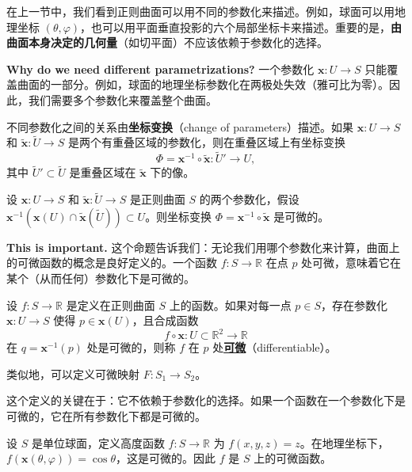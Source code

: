 在上一节中，我们看到正则曲面可以用不同的参数化来描述。例如，球面可以用地理坐标 $(\theta, \varphi)$，也可以用平面垂直投影的六个局部坐标卡来描述。重要的是，\textbf{由曲面本身决定的几何量}（如切平面）不应该依赖于参数化的选择。

\textbf{Why do we need different parametrizations?} 一个参数化 $\mathbf{x}: U \to S$ 只能覆盖曲面的一部分。例如，球面的地理坐标参数化在两极处失效（雅可比为零）。因此，我们需要多个参数化来覆盖整个曲面。

不同参数化之间的关系由\textbf{坐标变换}（change of parameters）描述。如果 $\mathbf{x}: U \to S$ 和 $\tilde{\mathbf{x}}: \tilde{U} \to S$ 是两个有重叠区域的参数化，则在重叠区域上有坐标变换
\[
\Phi = \mathbf{x}^{-1} \circ \tilde{\mathbf{x}}: \tilde{U}' \to U,
\]
其中 $\tilde{U}' \subset \tilde{U}$ 是重叠区域在 $\tilde{\mathbf{x}}$ 下的像。

\begin{Proposition}[坐标变换是可微的]\label{prop:change-of-params}
设 $\mathbf{x}: U \to S$ 和 $\tilde{\mathbf{x}}: \tilde{U} \to S$ 是正则曲面 $S$ 的两个参数化，假设 $\mathbf{x}^{-1}(\mathbf{x}(U) \cap \tilde{\mathbf{x}}(\tilde{U})) \subset U$。则坐标变换 $\Phi = \mathbf{x}^{-1} \circ \tilde{\mathbf{x}}$ 是可微的。
\end{Proposition}

\textbf{This is important.} 这个命题告诉我们：无论我们用哪个参数化来计算，曲面上的可微函数的概念是良好定义的。一个函数 $f: S \to \mathbb{R}$ 在点 $p$ 处可微，意味着它在某个（从而任何）参数化下是可微的。

\begin{Definition}[曲面上的可微函数]\label{def:differentiable-function-on-surface}
设 $f: S \to \mathbb{R}$ 是定义在正则曲面 $S$ 上的函数。如果对每一点 $p \in S$，存在参数化 $\mathbf{x}: U \to S$ 使得 $p \in \mathbf{x}(U)$，且合成函数
\[
f \circ \mathbf{x}: U \subset \mathbb{R}^2 \to \mathbb{R}
\]
在 $q = \mathbf{x}^{-1}(p)$ 处是可微的，则称 $f$ 在 $p$ 处\textbf{\underline{可微}}（differentiable）。
\end{Definition}

类似地，可以定义可微映射 $F: S_1 \to S_2$。

\begin{Remark}
这个定义的关键在于：它不依赖于参数化的选择。如果一个函数在一个参数化下是可微的，它在所有参数化下都是可微的。
\end{Remark}

\begin{Example}[高度函数]\label{ex:height-function}
设 $S$ 是单位球面，定义高度函数 $f: S \to \mathbb{R}$ 为 $f(x,y,z) = z$。在地理坐标下，$f(\mathbf{x}(\theta,\varphi)) = \cos\theta$，这是可微的。因此 $f$ 是 $S$ 上的可微函数。
\end{Example}

